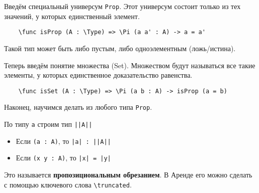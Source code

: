 Введём специальный универсум \texttt{Prop}. Этот универсум состоит только из тех значений, у которых единственный элемент.

\begin{verbatim}
    \func isProp (A : \Type) => \Pi (a a' : A) -> a = a'
\end{verbatim}

Такой тип может быть либо пустым, либо одноэлементным (ложь/истина).

Теперь введём понятие множества (Set). Множеством будут называться все такие элементы, у которых единственное доказательство равенства.

\begin{verbatim}
    \func isSet (A : \Type) => \Pi (a b : A) -> isProp (a = b)
\end{verbatim}

Наконец, научимся делать из любого типа \texttt{Prop}.

По типу \texttt{a} строим тип \texttt{||A||}
\begin{itemize}
    \item Если \texttt{(a : A)}, то \texttt{|a| : ||A||}
    \item Если \texttt{(x y : A)}, то \texttt{|x| = |y|}
\end{itemize}
Это называется \textbf{пропозициональным обрезанием}. В Аренде его можно сделать с помощью ключевого слова \texttt{\textbackslash truncated}.




